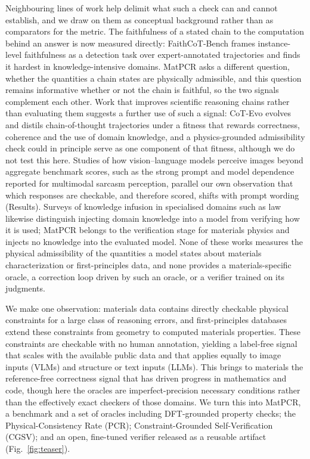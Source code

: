 \documentclass[pdflatex,sn-nature]{sn-jnl}
\newcommand{\rev}[1]{#1}
\newcommand{\rev}[1]{{\color{blue}#1}}
\begin{document}
\rev{Neighbouring lines of work help delimit what such a check can and cannot establish, and we
draw on them as conceptual background rather than as comparators for the metric. The faithfulness of
a stated chain to the computation behind an answer is now measured directly: FaithCoT-Bench frames
instance-level faithfulness as a detection task over expert-annotated trajectories and finds it
hardest in knowledge-intensive domains.\cite{faithcotbench2026} MatPCR asks a different question,
whether the quantities a chain states are physically admissible, and this question remains
informative whether or not the chain is faithful, so the two signals complement each other. Work that
improves scientific reasoning chains rather than evaluating them suggests a further use of such a
signal: CoT-Evo evolves and distils chain-of-thought trajectories under a fitness that rewards
correctness, coherence and the use of domain knowledge,\cite{cotevo2026} and a physics-grounded
admissibility check could in principle serve as one component of that fitness, although we do not
test this here. Studies of how vision--language models perceive images beyond aggregate benchmark
scores, such as the strong prompt and model dependence reported for multimodal sarcasm
perception,\cite{sarcasm2026lvlm} parallel our own observation that which responses are checkable,
and therefore scored, shifts with prompt wording (Results). Surveys of knowledge infusion in
specialised domains such as law\cite{legalinfusion2026} likewise distinguish injecting domain
knowledge into a model from verifying how it is used; MatPCR belongs to the verification stage for
materials physics and injects no knowledge into the evaluated model. None of these works measures the
physical admissibility of the quantities a model states about materials characterization or
first-principles data, and none provides a materials-specific oracle, a correction loop driven by
such an oracle, or a verifier trained on its judgments.}

We make one observation: materials data contains directly checkable physical
constraints for a large class of reasoning errors, and first-principles databases
extend these constraints from geometry to computed materials properties. These constraints are
checkable with no human annotation, yielding a label-free signal that scales with the
available public data and that applies equally to image inputs (VLMs) and
structure or text inputs (LLMs). This brings to materials the reference-free correctness
signal that has driven progress in mathematics and code, though here the oracles are
imperfect-precision necessary conditions rather than the effectively exact checkers of
those domains. We turn this into MatPCR, a benchmark and a set of
oracles including DFT-grounded property checks; the Physical-Consistency Rate (PCR);
Constraint-Grounded Self-Verification (CGSV); and an open, fine-tuned verifier
released as a reusable artifact (Fig.~\ref{fig:teaser}).
\end{document}
